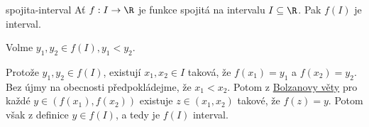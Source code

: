 \begin{corollary}{}{spojita-interval}
 Ať $f: I \to \R$ je funkce spojitá na intervalu $I \subseteq \R$. Pak $f(I)$ je
 interval.
\end{corollary}
\begin{corproof}
 Volme $y_1,y_2 \in f(I), y_1 < y_2$.

 Protože $y_1,y_2 \in f(I)$, existují $x_1,x_2 \in I$ taková, že $f(x_1) = y_1$
 a $f(x_2) = y_2$. Bez újmy na obecnosti předpokládejme, že $x_1 < x_2$. Potom z
 \hyperref[thm:bolzanova]{Bolzanovy věty} pro každé $y \in (f(x_1),f(x_2))$
 existuje $z \in (x_1,x_2)$ takové, že $f(z) = y$. Potom však z definice $y \in
 f(I)$, a tedy je $f(I)$ interval.
\end{corproof}

